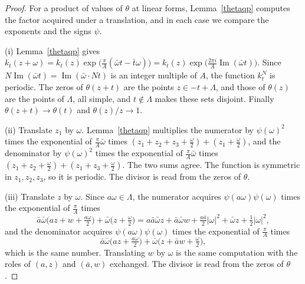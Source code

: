 \begin{proof}
For a product of values of $\theta$ at linear forms, Lemma~\ref{thetaqp} computes the factor acquired under a translation, and in each case we compare the exponents and the signs $\psi$.

(i) Lemma~\ref{thetaqp} gives $k_t(z+\omega)=k_t(z)\exp\big(\frac\pi A(\bar\omega t-\bar t\omega)\big)=k_t(z)\exp\big(\frac{2\pi i}A\operatorname{Im}(\bar\omega t)\big)$. Since $N\operatorname{Im}(\bar\omega t)=\operatorname{Im}(\bar\omega\cdot Nt)$ is an integer multiple of $A$, the function $k_t^N$ is periodic. The zeros of $\theta(z+t)$ are the points $z\in-t+\Lambda$, and those of $\theta(z)$ are the points of $\Lambda$, all simple, and $t\notin\Lambda$ makes these sets disjoint. Finally $\theta(z+t)\to\theta(t)$ and $\theta(z)/z\to1$.

(ii) Translate $z_1$ by $\omega$. Lemma~\ref{thetaqp} multiplies the numerator by $\psi(\omega)^2$ times the exponential of $\frac\pi A\bar\omega$ times $(z_1+z_2+z_3+\frac\omega2)+(z_1+\frac\omega2)$, and the denominator by $\psi(\omega)^2$ times the exponential of $\frac\pi A\bar\omega$ times $(z_1+z_2+\frac\omega2)+(z_1+z_3+\frac\omega2)$. The two sums agree. The function is symmetric in $z_1,z_2,z_3$, so it is periodic. The divisor is read from the zeros of $\theta$.

(iii) Translate $z$ by $\omega$. Since $a\omega\in\Lambda$, the numerator acquires $\psi(a\omega)\psi(\omega)$ times the exponential of $\frac\pi A$ times
\[
\bar a\bar\omega\big(az+w+\tfrac{a\omega}2\big)+\bar\omega\big(z+\tfrac\omega2\big)=a\bar a\bar\omega z+\bar a\bar\omega w+\tfrac{a\bar a}2\lvert\omega\rvert^2+\bar\omega z+\tfrac12\lvert\omega\rvert^2,
\]
and the denominator acquires $\psi(a\omega)\psi(\omega)$ times the exponential of $\frac\pi A$ times
\[
\bar a\bar\omega\big(az+\tfrac{a\omega}2\big)+\bar\omega\big(z+\bar aw+\tfrac\omega2\big),
\]
which is the same number. Translating $w$ by $\omega$ is the same computation with the roles of $(a,z)$ and $(\bar a,w)$ exchanged. The divisor is read from the zeros of $\theta$.


\end{proof}
